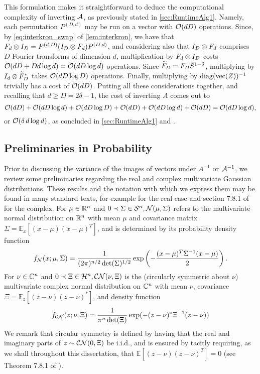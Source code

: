 This formulation makes it straightforward to deduce the computational complexity of inverting $\mathcal{A}$, as previously stated in \cref{sec:RuntimeAlg1}.  Namely, each permutation $P^{(D, d)}$ may be run on a vector with $\mathcal{O}(d D)$ operations.  Since, by \eqref{eq:interkron_swap} of \cref{lem:interkron}, we have that $F_d \otimes I_D = P^{(d, D)}(I_D \otimes F_d) P^{(D, d)}$, and considering also that $I_D \otimes F_d$ comprises $D$ Fourier transforms of dimension $d$, multiplication by $F_d \otimes I_D$ costs $\mathcal{O}(d D + D d \log d) = \mathcal{O}(d D \log d)$ operations.  Since $\widetilde{F}_D = F_D S^{1-\delta}$, multiplying by $I_d \otimes \widetilde{F}_D^*$ takes $\mathcal{O}(d D \log D)$ operations.  Finally, multiplying by $\operatorname{diag}(\operatorname{vec}(Z))^{-1}$ trivially has a cost of $\mathcal{O}(d D)$.  Putting all these considerations together, and recalling that $d \ge D = 2 \delta - 1$, the cost of inverting $A$ comes out to \[\mathcal{O}(d D) + \mathcal{O}(d D \log d) + \mathcal{O}(d D \log D) + \mathcal{O}(d D) + \mathcal{O}(d D \log d) + \mathcal{O}(d D) = \mathcal{O}(d D \log d),\] or $\mathcal{O}(\delta\, d \log d)$, as concluded in \cref{sec:RuntimeAlg1} and \cite{IVW2015_FastPhase}.

\subsection{Preliminaries in Probability}
Prior to discussing the variance of the images of vectors under $A^{-1}$ or $\mathcal{A}^{-1}$, we review some preliminaries regarding the real and complex multivariate Gaussian distributions.  These results and the notation with which we express them may be found in many standard texts, for example \cite{tong1990normal} for the real case and section 7.8.1 of \cite{gallager2008digital} for the complex.  For $\mu \in \mathbb{R}^n$ and $0 \prec \Sigma \in \mathcal{S}^n, \mathcal{N}(\mu, \Sigma)$ refers to the multivariate normal distribution on $\mathbb{R}^n$ with mean $\mu$ and covariance matrix $\Sigma = \mathbb{E}_x[(x - \mu) (x - \mu)^T]$, and is determined by its probability density function \[f_{\mathcal{N}}(x; \mu, \Sigma) = \frac{1}{(2 \pi)^{n / 2} \det(\Sigma)^{1 / 2}} \exp\left(- \dfrac{(x - \mu)^T \Sigma^{-1} (x - \mu)}{2}\right).\]  For $\nu \in \mathbb{C}^n$ and $0 \prec \Xi \in \mathcal{H}^n, \mathcal{C N}(\nu, \Xi)$ is the (circularly symmetric about $\nu$) multivariate complex normal distribution on $\mathbb{C}^n$ with mean $\nu$, covariance $\Xi = \mathbb{E}_z[(z - \nu) (z - \nu)^*]$, and density function \[f_{\mathcal{C N}}(z; \nu, \Xi) = \dfrac{1}{\pi^n \det(\Xi)} \exp(- (z - \nu)^* \Xi^{-1} (z - \nu))\]  We remark that circular symmetry is defined by having that the real and imaginary parts of $z \sim \mathcal{C N}(0, \Xi)$ be i.i.d., and is ensured by tacitly requiring, as we shall throughout this dissertation, that $\mathbb{E}[(z - \nu) (z - \nu)^T] = 0$ (see Theorem 7.8.1 of \cite{gallager2008digital}).

